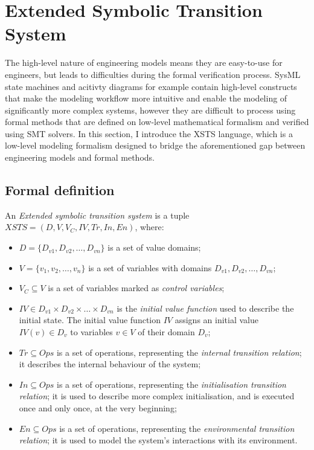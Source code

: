\section{Extended Symbolic Transition System}\label{sec:xsts}

The high-level nature of engineering models means they are easy-to-use for engineers, but leads to difficulties during the formal verification process. SysML state machines and acitivty diagrams for example contain high-level  constructs that make the modeling workflow more intuitive and enable the modeling of significantly more complex systems, however they are difficult to process using formal methods that are defined on low-level mathematical formalism and verified using SMT solvers. In this section, I introduce the XSTS\cite{xsts} language, which is a low-level modeling formalism designed to bridge the aforementioned gap between engineering models and formal methods.

\subsection{Formal definition}

\begin{definition}
	
	An \emph{Extended symbolic transition system} is a tuple \( XSTS = (D, V, V_C, IV, Tr, In, En) \), where:
	
	\begin{itemize}
		\item \(D = \{ D_{v1}, D_{v2}, \dots, D_{vn} \} \) is a set of value domains;
		\item \(V = \{ v_1, v_2, \dots, v_n \} \) is a set of variables with domains \(D_{v1}, D_{v2}, \dots, D_{vn}\);
		\item \(V_C \subseteq V\) is a set of variables marked as \emph{control variables};
		\item \(IV \in D_{v1} \times D_{v2} \times \dots \times D_{vn}\) is the \emph{initial value function} used to describe the initial state. The initial value function \(IV\) assigns an initial value \(IV(v) \in D_v\) to variables \(v \in V\) of their domain \(D_v\);
		\item \(Tr \subseteq Ops\) is a set of operations, representing the \emph{internal transition relation}; it describes the internal behaviour of the system;
		\item \(In \subseteq Ops\) is a set of operations, representing the \emph{initialisation transition relation}; it is used to describe more complex initialisation, and is executed once and only once, at the very beginning;
		\item \(En \subseteq Ops\) is a set of operations, representing the \emph{environmental transition relation}; it is used to model the system's interactions with its environment.
	\end{itemize}
\end{definition}\label{def:xsts}

